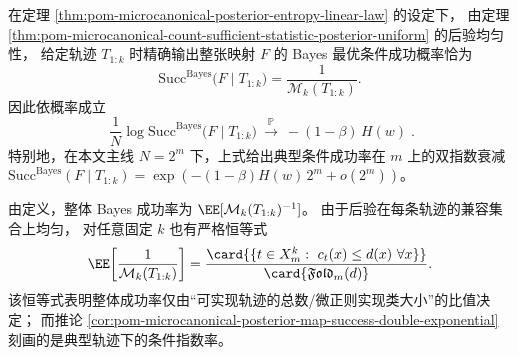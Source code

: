 \begin{corollary}[典型后验精确恢复成功率的双指数衰减]\label{cor:pom-microcanonical-posterior-map-success-double-exponential}
在定理 \ref{thm:pom-microcanonical-posterior-entropy-linear-law} 的设定下，
由定理 \ref{thm:pom-microcanonical-count-sufficient-statistic-posterior-uniform} 的后验均匀性，
给定轨迹 \(T_{1:k}\) 时精确输出整张映射 \(F\) 的 Bayes 最优条件成功概率恰为
\[
\mathrm{Succ}^{\mathrm{Bayes}}\bigl(F\mid T_{1:k}\bigr)=\frac{1}{\mathcal{M}_k(T_{1:k})}.
\]
因此依概率成立
\[
\boxed{\;
\frac{1}{N}\log \mathrm{Succ}^{\mathrm{Bayes}}\bigl(F\mid T_{1:k}\bigr)
\ \xrightarrow{\ \mathbb{P}\ }\ -(1-\beta)\,H(w)\; } .
\]
特别地，在本文主线 \(N=2^m\) 下，上式给出典型条件成功率在 \(m\) 上的双指数衰减
\(
\mathrm{Succ}^{\mathrm{Bayes}}(F\mid T_{1:k})
=\exp(-(1-\beta)H(w)\,2^m+o(2^m))
\)。
\end{corollary}

\begin{remark}\label{rem:pom-microcanonical-global-vs-typical-bayes-success}
由定义，整体 Bayes 成功率为 \(\EE[\mathcal{M}_k(T_{1:k})^{-1}]\)。
由于后验在每条轨迹的兼容集合上均匀，
对任意固定 \(k\) 也有严格恒等式
\[
\EE\!\left[\frac{1}{\mathcal{M}_k(T_{1:k})}\right]
=\frac{\card{\{t\in X_m^k:\ c_t(x)\le d(x)\ \forall x\}}}{\card{\mathfrak{Fold}_m(d)}}.
\]
该恒等式表明整体成功率仅由“可实现轨迹的总数/微正则实现类大小”的比值决定；
而推论 \ref{cor:pom-microcanonical-posterior-map-success-double-exponential} 刻画的是典型轨迹下的条件指数率。
\end{remark}

\endinput

